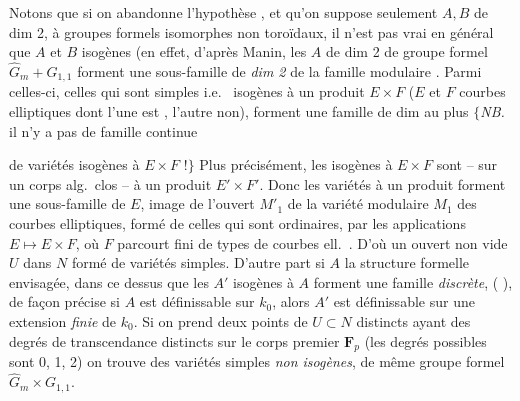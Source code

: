 \documentclass[11pt,a4paper]{article}
\begin{document}
Notons que si on abandonne l'hypothèse , et
qu'on suppose seulement $A,B$ \struck{\ill{}} de dim 2, à groupes formels
isomorphes non toroïdaux, il n'est pas vrai en général que $A$ et $B$
 isogènes  (en
effet, d'après Manin, les  $A$ de dim 2
 de groupe formel
$\widehat{G}_m+G_{1,1}$ forment une sous-famille  \ill{} de
\emph{dim 2} de la famille modulaire . Parmi celles-ci, celles
qui sont   simples i.e.\ 
isogènes à un produit $E\times F$ ($E$ et $F$ courbes elliptiques dont l'une
 est , l'autre non), forment une
famille de dim  au plus $\lbrace$\emph{NB.} il n'y a pas de famille
continue

de variétés isogènes à $E\times F$ !$\rbrace$ Plus précisément, les
 isogènes à $E\times F$ \struck{\ill{}} sont -- sur un
corps alg.\ clos --   à un produit
$E'\times F'$. Donc les variétés  à un produit forment
une sous-famille \ill{} de $E$, image de l'ouvert $M'_1$ de la variété
modulaire $M_1$ des courbes elliptiques, formé de celles qui sont
ordinaires, par les applications $E\mapsto E\times F$, où $F$ parcourt
\ill{} fini de types de courbes ell.\ . D'où un
ouvert non vide $U$ dans $N$ \struck{\ill{}} formé de variétés simples.
 D'autre part si $A$ \ill{}  \ill{} \ill{}
\ill{} la structure formelle envisagée, dans ce \ill{} \ill{} dessus que les
$A'$ isogènes à $A$ forment une famille \emph{discrète}, (\ill{} \ill{}),
de façon précise si $A$ est définissable sur $k_0$, alors $A'$ est
définissable sur une extension \emph{finie} de $k_0$. Si on prend deux
points \ill{} de \struck{\ill{}} $U\subset N$  distincts ayant des degrés de transcendance distincts sur le corps
premier $\mathbf{F}_p$ (les degrés possibles sont 0, 1, 2) on trouve des
variétés simples \emph{non isogènes}, de même groupe formel
$\widehat{G}_m\times G_{1,1}$.
\end{document}
